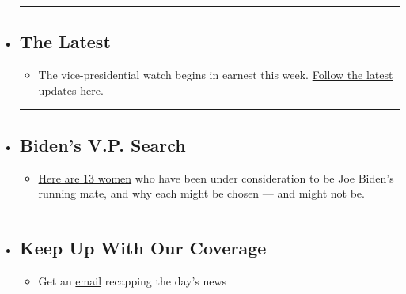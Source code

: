 \begin{itemize}
\item
  \begin{center}\rule{0.5\linewidth}{\linethickness}\end{center}

  \hypertarget{the-latest}{%
  \subsection{The Latest}\label{the-latest}}

  \begin{itemize}
  \tightlist
  \item
    The vice-presidential watch begins in earnest this week.
    \href{https://www.nytimes.com/2020/08/03/us/elections/biden-vs-trump.html?action=click\&pgtype=Article\&state=default\&region=BELOW_MAIN_CONTENT\&context=storylines_guide}{Follow
    the latest updates here.}
  \end{itemize}
\item
  \begin{center}\rule{0.5\linewidth}{\linethickness}\end{center}

  \hypertarget{bidens-vp-search}{%
  \subsection{Biden's V.P. Search}\label{bidens-vp-search}}

  \begin{itemize}
  \tightlist
  \item
    \href{https://www.nytimes.com/article/biden-vice-president-2020.html?action=click\&pgtype=Article\&state=default\&region=BELOW_MAIN_CONTENT\&context=storylines_guide}{Here
    are 13 women} who have been under consideration to be Joe Biden's
    running mate, and why each might be chosen --- and might not be.
  \end{itemize}
\item
  \begin{center}\rule{0.5\linewidth}{\linethickness}\end{center}

  \hypertarget{keep-up-with-our-coverage}{%
  \subsection{Keep Up With Our
  Coverage}\label{keep-up-with-our-coverage}}

  \begin{itemize}
  \tightlist
  \item
    Get an
    \href{https://www.nytimes.com/newsletters/politics?action=click\&pgtype=Article\&state=default\&region=BELOW_MAIN_CONTENT\&context=storylines_guide}{email}
    recapping the day's news
  \end{itemize}


\end{itemize}
